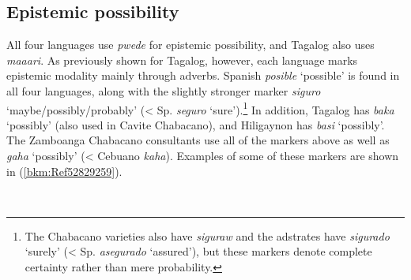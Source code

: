 \documentclass[output=paper]{langsci/langscibook}
\begin{document}
\subsection{Epistemic possibility}

All four languages use \textit{pwede} for epistemic possibility, and Tagalog also uses \textit{maaari}. As previously shown for Tagalog, however, each language marks epistemic modality mainly through adverbs. Spanish \textit{posible} ‘possible’ is found in all four languages, along with the slightly stronger marker \textit{siguro} ‘maybe/possibly/probably’ (< Sp. \textit{seguro} ‘sure’).\footnote{The Chabacano varieties also have \textit{siguraw} and the adstrates have \textit{sigurado} ‘surely’ (< Sp. \textit{asegurado} ‘assured’), but these markers denote complete certainty rather than mere probability.} In addition, Tagalog has \textit{baka} ‘possibly’ (also used in Cavite Chabacano), and Hiligaynon has \textit{basi} ‘possibly’. The Zamboanga Chabacano consultants use all of the markers above as well as \textit{gaha} ‘possibly’ (< Cebuano \textit{kaha}). Examples of some of these markers are shown in (\ref{bkm:Ref52829259}).

{}\\
\end{document}
